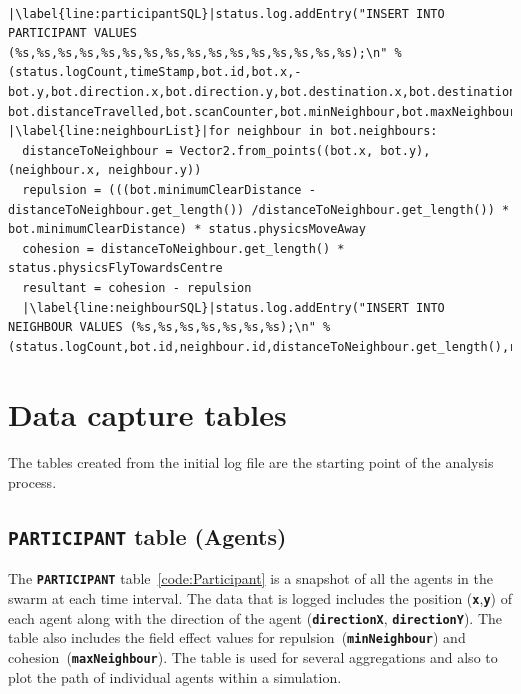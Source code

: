 \lstset{language=Python,
basicstyle=\tiny,
numbers=left, 
numberstyle=\tiny,
captionpos=b,
keepspaces=true,
showspaces=false, 
showstringspaces=false,
showtabs=false,
frame=single,
breaklines=true,
caption=Simulator data capture,
escapechar=|
} %
\begin{lstlisting}[label={code:SQL2}]  % Start your code-block

|\label{line:participantSQL}|status.log.addEntry("INSERT INTO PARTICIPANT VALUES (%s,%s,%s,%s,%s,%s,%s,%s,%s,%s,%s,%s,%s,%s,%s,%s);\n" % (status.logCount,timeStamp,bot.id,bot.x,-bot.y,bot.direction.x,bot.direction.y,bot.destination.x,bot.destination.y,bot.alive, bot.distanceTravelled,bot.scanCounter,bot.minNeighbour,bot.maxNeighbour,bot.isPerimeter,bot.scanning))
|\label{line:neighbourList}|for neighbour in bot.neighbours:
  distanceToNeighbour = Vector2.from_points((bot.x, bot.y),(neighbour.x, neighbour.y))
  repulsion = (((bot.minimumClearDistance - distanceToNeighbour.get_length()) /distanceToNeighbour.get_length()) * bot.minimumClearDistance) * status.physicsMoveAway
  cohesion = distanceToNeighbour.get_length() * status.physicsFlyTowardsCentre
  resultant = cohesion - repulsion
  |\label{line:neighbourSQL}|status.log.addEntry("INSERT INTO NEIGHBOUR VALUES (%s,%s,%s,%s,%s,%s,%s);\n" % (status.logCount,bot.id,neighbour.id,distanceToNeighbour.get_length(),resultant,cohesion,repulsion))
\end{lstlisting}

\section{Data capture tables}
The tables created from the initial log file are the starting point of the analysis process. 

\subsection{\texttt{\textbf{PARTICIPANT}} table (Agents)}
The \texttt{\textbf{PARTICIPANT}} table~\ref{code:Participant} is a snapshot of all the agents in the swarm at each time interval. The data that is logged includes the position (\texttt{\textbf{x}},\texttt{\textbf{y}}) of each agent along with the direction of the agent (\texttt{\textbf{directionX}}, \texttt{\textbf{directionY}}). The table also includes the field effect values for repulsion~(\texttt{\textbf{minNeighbour}}) and cohesion~(\texttt{\textbf{maxNeighbour}}). The table is used for several aggregations and also to plot the path of individual agents within a simulation.

